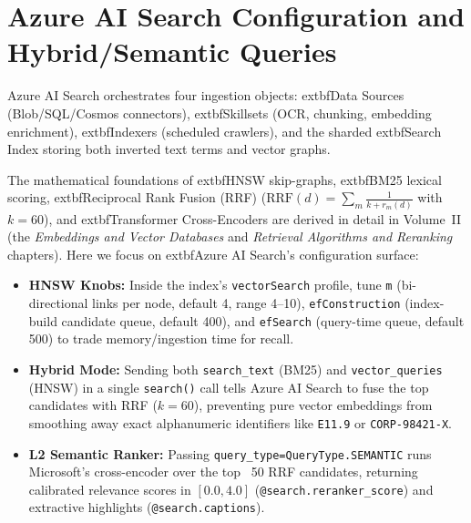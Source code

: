\section{Azure AI Search Configuration and Hybrid/Semantic Queries}

Azure AI Search orchestrates four ingestion objects: 	extbf{Data Sources} (Blob/SQL/Cosmos connectors), 	extbf{Skillsets} (OCR, chunking, embedding enrichment), 	extbf{Indexers} (scheduled crawlers), and the sharded 	extbf{Search Index} storing both inverted text terms and vector graphs.

The mathematical foundations of 	extbf{HNSW skip-graphs}, 	extbf{BM25 lexical scoring}, 	extbf{Reciprocal Rank Fusion (RRF)} ($\text{RRF}(d) = \sum_{m} \frac{1}{k + r_m(d)}$ with $k=60$), and 	extbf{Transformer Cross-Encoders} are derived in detail in Volume~II (the \emph{Embeddings and Vector Databases} and \emph{Retrieval Algorithms and Reranking} chapters). Here we focus on 	extbf{Azure AI Search's configuration surface}:
\begin{itemize}[leftmargin=12pt]
  \item \textbf{HNSW Knobs:} Inside the index's \texttt{vectorSearch} profile, tune \texttt{m} (bi-directional links per node, default 4, range 4--10), \texttt{efConstruction} (index-build candidate queue, default 400), and \texttt{efSearch} (query-time queue, default 500) to trade memory/ingestion time for recall.
  \item \textbf{Hybrid Mode:} Sending both \texttt{search\_text} (BM25) and \texttt{vector\_queries} (HNSW) in a single \texttt{search()} call tells Azure AI Search to fuse the top candidates with RRF ($k=60$), preventing pure vector embeddings from smoothing away exact alphanumeric identifiers like \texttt{E11.9} or \texttt{CORP-98421-X}.
  \item \textbf{L2 Semantic Ranker:} Passing \texttt{query\_type=QueryType.SEMANTIC} runs Microsoft's cross-encoder over the top ~50 RRF candidates, returning calibrated relevance scores in $[0.0, 4.0]$ (\texttt{@search.reranker\_score}) and extractive highlights (\texttt{@search.captions}).
\end{itemize}

